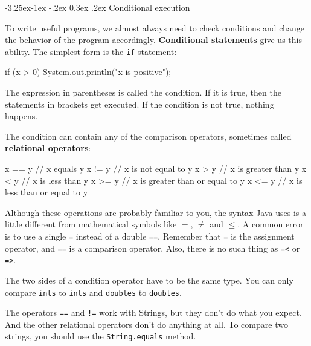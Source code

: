 \documentclass[12pt]{book}
\makeatletter
\renewcommand\subsection{\@startsection{subsection}{2}{\z@}%
    {-3.25ex\@plus -1ex \@minus -.2ex}%
    {0.3ex \@plus .2ex}%
    {\normalfont\large\bfseries}}
\theoremstyle{exercise}
\newcommand{\java}[1]{\lstinline{#1}} %
\makeatother
\begin{document}
\subsection{Conditional execution}


To write useful programs, we almost always need to check conditions and change the behavior of the program accordingly.
{\bf Conditional statements} give us this ability.
The simplest form is the {\tt if} statement:

\begin{code}
    if (x > 0) {
        System.out.println("x is positive");
    }
\end{code}

The expression in parentheses is called the condition.
If it is true, then the statements in brackets get executed.
If the condition is not true, nothing happens.


The condition can contain any of the comparison operators, sometimes called {\bf relational operators}:

\begin{code}
    x == y               // x equals y
    x != y               // x is not equal to y
    x > y                // x is greater than y
    x < y                // x is less than y
    x >= y               // x is greater than or equal to y
    x <= y               // x is less than or equal to y
\end{code}

Although these operations are probably familiar to you, the syntax Java uses is a little different from mathematical symbols like $=$, $\neq$ and $\le$.
A common error is to use a single {\tt =} instead of a double {\tt ==}.
Remember that {\tt =} is the assignment operator, and {\tt ==} is a comparison operator.
Also, there is no such thing as {\tt =<} or {\tt =>}.

The two sides of a condition operator have to be the same type.
You can only compare {\tt ints} to {\tt ints} and {\tt doubles} to {\tt doubles}.

The operators {\tt ==} and {\tt !=} work with Strings, but they don't do what you expect.
And the other relational operators don't do anything at all.
To compare two strings, you should use the \java{String.equals} method.
\end{document}
